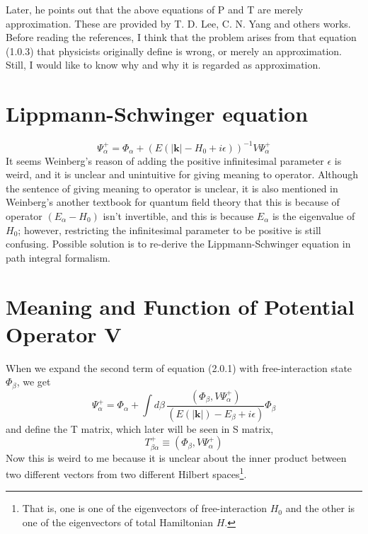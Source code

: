 \documentclass[12pt]{article}
\numberwithin{equation}{subsection}
\begin{document}
Later, he points out that the above equations of P and T are merely approximation.
These are provided by T. D. Lee, C. N. Yang and others works\cite{PhysRev.104.254}\cite{PhysRevLett.13.138}. 
Before reading the references, I think that the problem arises from that equation (1.0.3) that physicists originally define is wrong, or merely an approximation.
Still, I would like to know why and why it is regarded as approximation.
\section{Lippmann-Schwinger equation}
\begin{equation}
    \Psi_{\alpha}^{+} = \Phi_{\alpha}+\left(E(|\mathbf{k}|-H_{0}+i\epsilon)\right)^{-1}V\Psi_{\alpha}^{+}
\end{equation}
It seems Weinberg's reason\cite{Weinberg_2015} of adding the positive infinitesimal parameter $\epsilon$ is weird, and it is unclear and unintuitive for giving meaning to operator.
Although the sentence of giving meaning to operator is unclear, it is also mentioned in Weinberg's another textbook for quantum field theory\cite{Weinberg_1995_3} that this is because of operator $(E_{\alpha}-H_0)$ isn't invertible, and this is because $E_{\alpha}$ is the eigenvalue of $H_0$; however, restricting the infinitesimal parameter to be positive is still confusing.
Possible solution is to re-derive the Lippmann-Schwinger equation\cite{PhysRev.79.469} in path integral formalism.
\section{Meaning and Function of Potential Operator V}
When we expand the second term of equation (2.0.1) with free-interaction state $\Phi_{\beta}$, we get
\begin{equation}
    \Psi_{\alpha}^{+} = \Phi_{\alpha} + \int{d\beta\,\frac{(\Phi_{\beta}, V\Psi_{\alpha}^{+})}{(E(|\mathbf{k}|)-E_{\beta}+i\epsilon)}\Phi_{\beta}}
\end{equation}
and define the T matrix, which later will be seen in S matrix,
\begin{equation}
    T_{\beta\alpha}^{+} \equiv (\Phi_{\beta}, V\Psi_{\alpha}^{+})
\end{equation}
Now this is weird to me because it is unclear about the inner product between two different vectors from two different Hilbert spaces\footnote{That is, one is one of the eigenvectors of free-interaction $H_0$ and the other is one of the eigenvectors of total Hamiltonian $H$.}.



\end{document}

